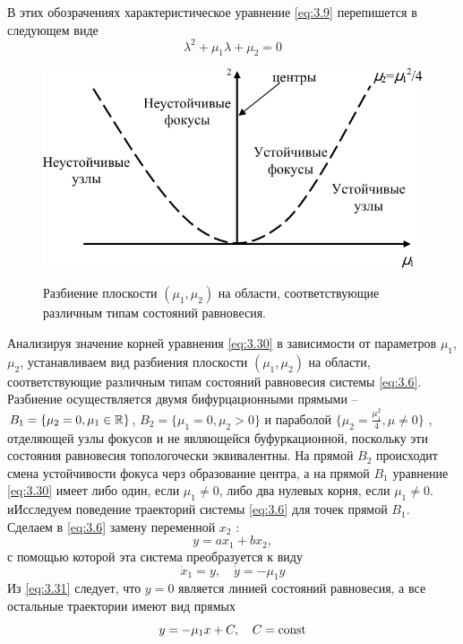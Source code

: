 В этих обозрачениях характеристическое уравнение \eqref{eq:3.9} перепишется в следующем виде
\begin{equation}
        \label{eq:3.30}
       \lambda^2 + \mu_1 \lambda + \mu_2 =0 
\end{equation}
\begin{figure}[h!]
        \centering
        \includegraphics[width=0.8\linewidth]{fig/lect3/8}
        \label{fig:3.8}
        \caption{Разбиение плоскости $(\mu_1,\mu_2)$ на области, соответствующие различным типам состояний равновесия.}
\end{figure}
Анализируя значение корней уравнения \eqref{eq:3.30} в зависимости от параметров $\mu_1$, $\mu_2$, устанавливаем вид разбиения плоскости $( \mu_1, \mu_2)$ на области, соответствующие различным типам состояний равновесия системы \eqref{eq:3.6}. Разбиение осуществляется двумя бифурцационными прямыми --$B_1 = \{ \mu_2=0, \mu_1 \in \mathbb{R} \}$, $B_2=\{\mu_1=0, \mu_2>0\}$ и параболой $\{ \mu_2= \frac{\mu_1^2}{4}, \mu \neq 0 \}   $
, отделяющей узлы фокусов и не являющейся буфуркационной, поскольку эти состояния равновесия топологочески эквивалентны. На прямой $B_2$ происходит смена устойчивости фокуса черз образование центра, а на прямой $B_1$ уравнение \eqref{eq:3.30} имеет либо один, если $\mu_1 \neq 0$, либо два нулевых корня, если $\mu_1\neq 0$. иИсследуем поведение траекторий системы \eqref{eq:3.6} для точек прямой $B_1$. Сделаем в \eqref{eq:3.6} замену переменной $x_2$ :
\begin{equation}
        \label{eq:}
        y= ax_1 + bx_2,
\end{equation}
с помощью которой эта система преобразуется к виду
\begin{equation}
        \label{eq:3.31}
        \dot x_1 = y, \quad \dot y = - \mu_1 y  
\end{equation}
Из \eqref{eq:3.31} следует, что $y=0$ является линией состояний равновесия, а все остальные траектории имеют вид прямых
\begin{equation}
        \label{eq:}
        y= - \mu_1x +C, \quad C=\textrm{const}
\end{equation}

